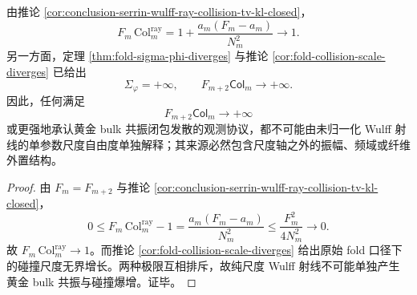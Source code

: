 \begin{corollary}\label{cor:conclusion-serrin-wulff-ray-no-golden-bulk-resonance-source}
由推论 \ref{cor:conclusion-serrin-wulff-ray-collision-tv-kl-closed}，
\[
F_m\,\mathrm{Col}_m^{\mathrm{ray}}
=
1+\frac{a_m(F_m-a_m)}{N_m^2}
\longrightarrow 1.
\]
另一方面，定理 \ref{thm:fold-sigma-phi-diverges} 与推论 \ref{cor:fold-collision-scale-diverges} 已给出
\[
\Sigma_\varphi=+\infty,
\qquad
F_{m+2}\mathsf{Col}_m\longrightarrow +\infty.
\]
因此，任何满足
\[
F_{m+2}\mathsf{Col}_m\to+\infty
\]
或更强地承认黄金 bulk 共振闭包发散的观测协议，都不可能由未归一化 Wulff 射线的单参数尺度自由度单独解释；其来源必然包含尺度轴之外的振幅、频域或纤维外置结构。
\end{corollary}
\begin{proof}
由 \(F_m=F_{m+2}\) 与推论 \ref{cor:conclusion-serrin-wulff-ray-collision-tv-kl-closed}，
\[
0\le
F_m\,\mathrm{Col}_m^{\mathrm{ray}}-1
=
\frac{a_m(F_m-a_m)}{N_m^2}
\le
\frac{F_m^2}{4N_m^2}
\longrightarrow 0.
\]
故 \(F_m\,\mathrm{Col}_m^{\mathrm{ray}}\to 1\)。而推论 \ref{cor:fold-collision-scale-diverges} 给出原始 fold 口径下的碰撞尺度无界增长。两种极限互相排斥，故纯尺度 Wulff 射线不可能单独产生黄金 bulk 共振与碰撞爆增。证毕。
\end{proof}

\endinput
